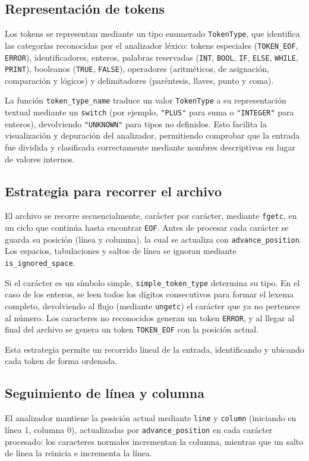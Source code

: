 \documentclass[12pt,letterpaper]{article}
\begin{document}
\subsection*{Representación de tokens}
Los tokens se representan mediante un tipo enumerado \texttt{TokenType}, que identifica las categorías reconocidas por el analizador léxico: tokens especiales (\texttt{TOKEN\_EOF}, \texttt{ERROR}), identificadores, enteros, palabras reservadas (\texttt{INT}, \texttt{BOOL}, \texttt{IF}, \texttt{ELSE}, \texttt{WHILE}, \texttt{PRINT}), booleanos (\texttt{TRUE}, \texttt{FALSE}), operadores (aritméticos, de asignación, comparación y lógicos) y delimitadores (paréntesis, llaves, punto y coma).

La función \texttt{token\_type\_name} traduce un valor \texttt{TokenType} a su representación textual mediante un \texttt{switch} (por ejemplo, \texttt{"PLUS"} para suma o \texttt{"INTEGER"} para enteros), devolviendo \texttt{"UNKNOWN"} para tipos no definidos. Esto facilita la visualización y depuración del analizador, permitiendo comprobar que la entrada fue dividida y clasificada correctamente mediante nombres descriptivos en lugar de valores internos.

\subsection*{Estrategia para recorrer el archivo}
El archivo se recorre secuencialmente, carácter por carácter, mediante \texttt{fgetc}, en un ciclo que continúa hasta encontrar \texttt{EOF}. Antes de procesar cada carácter se guarda su posición (línea y columna), la cual se actualiza con \texttt{advance\_position}. Los espacios, tabulaciones y saltos de línea se ignoran mediante \texttt{is\_ignored\_space}.

Si el carácter es un símbolo simple, \texttt{simple\_token\_type} determina su tipo. En el caso de los enteros, se leen todos los dígitos consecutivos para formar el lexema completo, devolviendo al flujo (mediante \texttt{ungetc}) el carácter que ya no pertenece al número. Los caracteres no reconocidos generan un token \texttt{ERROR}, y al llegar al final del archivo se genera un token \texttt{TOKEN\_EOF} con la posición actual.

Esta estrategia permite un recorrido lineal de la entrada, identificando y ubicando cada token de forma ordenada.

\subsection*{Seguimiento de línea y columna}
El analizador mantiene la posición actual mediante \texttt{line} y \texttt{column} (iniciando en línea 1, columna 0), actualizadas por \texttt{advance\_position} en cada carácter procesado: los caracteres normales incrementan la columna, mientras que un salto de línea la reinicia e incrementa la línea.
\end{document}

